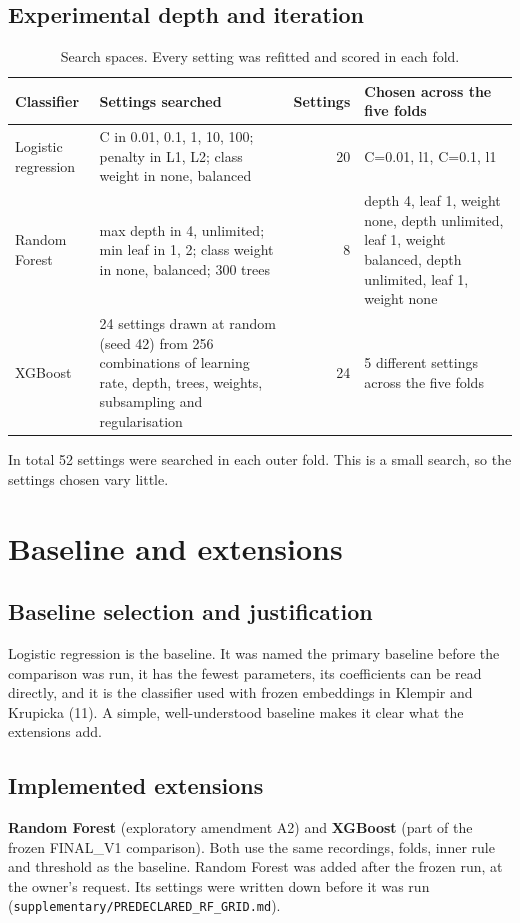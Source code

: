 \documentclass[11pt,a4paper]{article}
\begin{document}
\subsection{Experimental depth and iteration}\label{sec:depth}
\begin{table}[H]\centering\footnotesize\renewcommand{\arraystretch}{1.15}
\caption{Search spaces. Every setting was refitted and scored in each fold.}
\begin{tabular}{llrp{5cm}}
\toprule
\textbf{Classifier} & \textbf{Settings searched} & \textbf{Settings} & \textbf{Chosen across the five folds}\\
\midrule
Logistic regression & C in {0.01, 0.1, 1, 10, 100}; penalty in {L1, L2}; class weight in {none, balanced} & 20 & C=0.01, l1, C=0.1, l1\\
Random Forest & max depth in {4, unlimited}; min leaf in {1, 2}; class weight in {none, balanced}; 300 trees & 8 & depth 4, leaf 1, weight none, depth unlimited, leaf 1, weight balanced, depth unlimited, leaf 1, weight none\\
XGBoost & 24 settings drawn at random (seed 42) from 256 combinations of learning rate, depth, trees, weights, subsampling and regularisation & 24 & 5 different settings across the five folds\\
\bottomrule
\end{tabular}\end{table}
In total 52 settings were searched in each outer fold. This is a small search, so the settings chosen vary little.

\section{Baseline and extensions}\label{sec:baseline}
\subsection{Baseline selection and justification}\label{sec:baselineselect}
Logistic regression is the baseline. It was named the primary baseline before the comparison was run, it has the fewest parameters, its coefficients can be read directly, and it is the classifier used with frozen embeddings in Klempir and Krupicka (11). A simple, well-understood baseline makes it clear what the extensions add.

\subsection{Implemented extensions}\label{sec:extensions}
\textbf{Random Forest} (exploratory amendment A2) and \textbf{XGBoost} (part of the frozen FINAL\_V1 comparison). Both use the same recordings, folds, inner rule and threshold as the baseline. Random Forest was added after the frozen run, at the owner's request. Its settings were written down before it was run (\texttt{supplementary/PREDECLARED\_\allowbreak{}RF\_\allowbreak{}GRID.md}).
\end{document}

